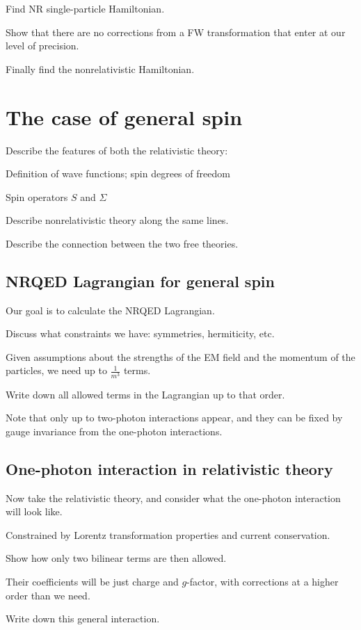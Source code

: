 \documentclass[12pt]{article}
\begin{document}
Find NR single-particle Hamiltonian.

Show that there are no corrections from a FW transformation that enter at our level of precision.

Finally find the nonrelativistic Hamiltonian.


\section{The case of general spin}


Describe the features of both the relativistic theory:

 Definition of wave functions; spin degrees of freedom
 
 Spin operators $S$ and $\Sigma$


Describe nonrelativistic theory along the same lines.

Describe the connection between the two free theories.

\subsection{NRQED Lagrangian for general spin}
Our goal is to calculate the NRQED Lagrangian.  

Discuss what constraints we have: symmetries, hermiticity, etc.

Given assumptions about the strengths of the EM field and the momentum of the particles, we need up to $\frac{1}{m^3}$ terms.

Write down all allowed terms in the Lagrangian up to that order.

Note that only up to two-photon interactions appear, and they can be fixed by gauge invariance from the one-photon interactions.


\subsection{One-photon interaction in relativistic theory}
Now take the relativistic theory, and consider what the one-photon interaction will look like.

Constrained by Lorentz transformation properties and current conservation.

Show how only two bilinear terms are then allowed.

Their coefficients will be just charge and $g$-factor, with corrections at a higher order than we need.

Write down this general interaction.
\end{document}
